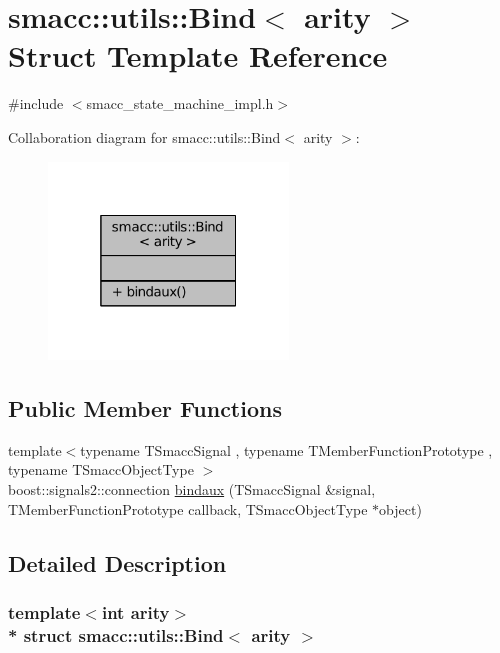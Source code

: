 \hypertarget{structsmacc_1_1utils_1_1Bind}{}\section{smacc\+:\+:utils\+:\+:Bind$<$ arity $>$ Struct Template Reference}
\label{structsmacc_1_1utils_1_1Bind}


{\ttfamily \#include $<$smacc\+\_\+state\+\_\+machine\+\_\+impl.\+h$>$}



Collaboration diagram for smacc\+:\+:utils\+:\+:Bind$<$ arity $>$\+:
\nopagebreak
\begin{figure}[H]
\begin{center}
\leavevmode
\includegraphics[width=181pt]{structsmacc_1_1utils_1_1Bind__coll__graph}
\end{center}
\end{figure}
\subsection*{Public Member Functions}
\begin{DoxyCompactItemize}
\item 
{\footnotesize template$<$typename T\+Smacc\+Signal , typename T\+Member\+Function\+Prototype , typename T\+Smacc\+Object\+Type $>$ }\\boost\+::signals2\+::connection \hyperlink{structsmacc_1_1utils_1_1Bind_aa0f4ba76fbd5fdb865df51b61d4269f3}{bindaux} (T\+Smacc\+Signal \&signal, T\+Member\+Function\+Prototype callback, T\+Smacc\+Object\+Type $\ast$object)
\end{DoxyCompactItemize}


\subsection{Detailed Description}
\subsubsection*{template$<$int arity$>$\\*
struct smacc\+::utils\+::\+Bind$<$ arity $>$}



